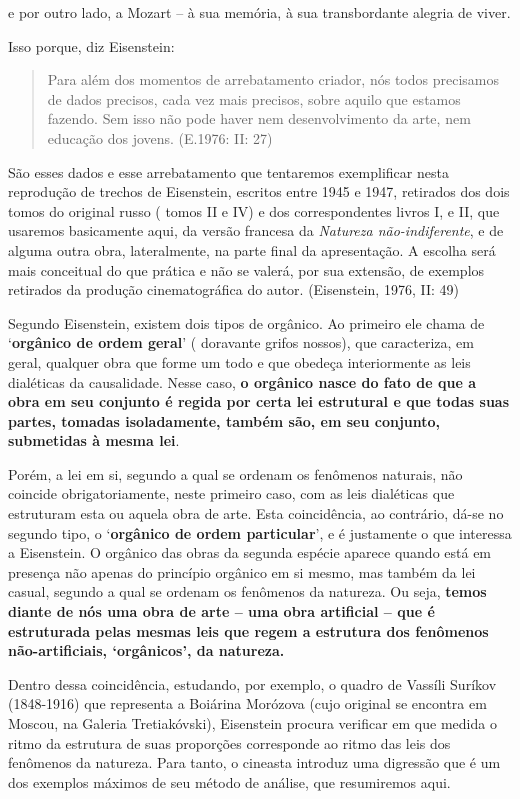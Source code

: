 e por outro lado, a Mozart -- à sua memória, à sua transbordante alegria
de viver.

Isso porque, diz Eisenstein:

\begin{quote}
Para além dos momentos de arrebatamento criador, nós todos precisamos de
dados precisos, cada vez mais precisos, sobre aquilo que estamos
fazendo. Sem isso não pode haver nem desenvolvimento da arte, nem
educação dos jovens. (E.1976: II: 27)
\end{quote}

São esses dados e esse arrebatamento que tentaremos exemplificar nesta
reprodução de trechos de Eisenstein, escritos entre 1945 e 1947,
retirados dos dois tomos do original russo ( tomos II e IV) e dos
correspondentes livros I, e II, que usaremos basicamente aqui, da versão
francesa da \emph{Natureza não-indiferente}, e de alguma outra obra,
lateralmente, na parte final da apresentação. A escolha será mais
conceitual do que prática e não se valerá, por sua extensão, de exemplos
retirados da produção cinematográfica do autor. (Eisenstein, 1976, II:
49)

Segundo Eisenstein, existem dois tipos de orgânico. Ao primeiro ele
chama de `\textbf{orgânico de ordem geral}' ( doravante grifos nossos),
que caracteriza, em geral, qualquer obra que forme um todo e que obedeça
interiormente as leis dialéticas da causalidade. Nesse caso, \textbf{o
orgânico nasce do fato de que a obra em seu conjunto é regida por certa
lei estrutural e que todas suas partes, tomadas isoladamente, também
são, em seu conjunto, submetidas à mesma lei}.

Porém, a lei em si, segundo a qual se ordenam os fenômenos naturais, não
coincide obrigatoriamente, neste primeiro caso, com as leis dialéticas
que estruturam esta ou aquela obra de arte. Esta coincidência, ao
contrário, dá-se no segundo tipo, o `\textbf{orgânico de ordem
particular}', e é justamente o que interessa a Eisenstein. O orgânico
das obras da segunda espécie aparece quando está em presença não apenas
do princípio orgânico em si mesmo, mas também da lei casual, segundo a
qual se ordenam os fenômenos da natureza. Ou seja, \textbf{temos diante
de nós uma obra de arte -- uma obra artificial -- que é estruturada
pelas mesmas leis que regem a estrutura dos fenômenos não-artificiais,
`orgânicos', da natureza.}

Dentro dessa coincidência, estudando, por exemplo, o quadro de Vassíli
Suríkov (1848-1916) que representa a Boiárina Morózova (cujo original se
encontra em Moscou, na Galeria Tretiakóvski), Eisenstein procura
verificar em que medida o ritmo da estrutura de suas proporções
corresponde ao ritmo das leis dos fenômenos da natureza. Para tanto, o
cineasta introduz uma digressão que é um dos exemplos máximos de seu
método de análise, que resumiremos aqui.

